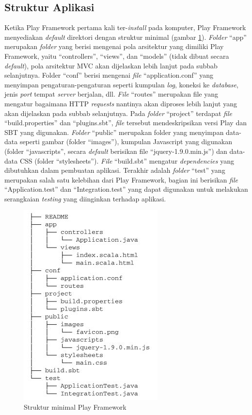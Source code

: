 \subsection{Struktur Aplikasi}
\label{sec:struktur_aplikasi}
Ketika Play Framework pertama kali ter-\textit{install} pada komputer, Play Framework menyediakan \textit{default} direktori dengan struktur minimal (gambar \ref{fig:2_strukturplay}). \textit{Folder} ``app'' merupakan \textit{folder} yang berisi mengenai pola arsitektur yang dimiliki Play Framework, yaitu ``controllers'', ``views'', dan ``models'' (tidak dibuat secara \textit{default}), pola arsitektur MVC akan dijelaskan lebih lanjut pada subbab selanjutnya. Folder ``conf'' berisi mengenai \textit{file} ``application.conf'' yang menyimpan pengaturan-pengaturan seperti kumpulan \textit{log}, koneksi ke \textit{database}, jenis \textit{port} tempat \textit{server} berjalan, dll. \textit{File} ``routes'' merupakan file yang mengatur bagaimana HTTP \textit{requests} nantinya akan diproses lebih lanjut yang akan dijelaskan pada subbab selanjutnya. Pada \textit{folder} ``project'' terdapat \textit{file} ``build.properties'' dan ``plugins.sbt'', \textit{file} tersebut mendeskripsikan versi Play dan SBT yang digunakan. \textit{Folder} ``public'' merupakan folder yang menyimpan data-data seperti gambar (folder ``images''), kumpulan Javascript yang digunakan (folder ``javascripts'', secara \textit{default} berisikan file ``jquery-1.9.0.min.js'') dan data-data CSS (folder ``stylesheets''). \textit{File} ``build.sbt'' mengatur \textit{dependencies} yang dibutuhkan dalam pembuatan aplikasi. Terakhir adalah \textit{folder} ``test'' yang merupakan salah satu kelebihan dari Play Framework, bagian ini berisikan \textit{file} ``Application.test'' dan ``Integration.test'' yang dapat digunakan untuk melakukan serangkaian \textit{testing} yang diinginkan terhadap aplikasi.

\begin{figure}[htbp]
	\centering
		\includegraphics[scale=0.7]{Gambar/2_strukturplay.JPG}
	\caption{Struktur minimal Play Framework}
	\label{fig:2_strukturplay}
\end{figure}


